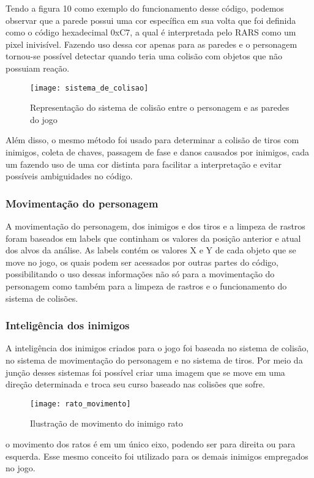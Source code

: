 \documentclass[conference]{IEEEtran}
\begin{document}
Tendo a figura 10 como exemplo do funcionamento desse código, podemos observar que a parede possui uma cor específica em sua volta que foi definida como o código hexadecimal 0xC7, a qual é interpretada pelo RARS como um pixel inivisível. Fazendo uso dessa cor apenas para as paredes e o personagem tornou-se possível detectar quando teria uma colisão com objetos que não possuiam reação.

\begin{figure}[h]
\centering
\texttt{[image: sistema\_de\_colisao]}
\caption{Representação do sistema de colisão entre o personagem e as paredes do jogo}
\end{figure}  

Além disso, o mesmo método foi usado para determinar a colisão de tiros com inimigos, coleta de chaves, passagem de fase e danos causados por inimigos, cada um fazendo uso de uma cor distinta para facilitar a interpretação e evitar possíveis ambiguidades no código.
\subsubsection{Movimentação do personagem} 
  A movimentação do personagem, dos inimigos e dos tiros e a limpeza de rastros foram baseados em labels que continham  os valores da posição anterior e atual dos alvos da análise. As labels contém os valores X e Y de cada objeto que se move no jogo, os quais podem ser acessados por outras partes do código, possibilitando o uso dessas informações não só para a movimentação do personagem como também para a limpeza de rastros e o funcionamento do sistema de colisões.
  
\subsubsection{Inteligência dos inimigos} 
A inteligência dos inimigos criados para o jogo foi baseada no sistema de colisão, no sistema de movimentação do personagem e no sistema de tiros. Por meio da junção desses sistemas foi possível criar uma imagem que se move em uma direção determinada e troca seu curso baseado nas colisões que sofre.

\begin{figure}[h]
\centering
\texttt{[image: rato\_movimento]}
\caption{Ilustração de movimento do inimigo rato}
\end{figure}  

o movimento dos ratos é em um único eixo, podendo ser para direita ou para esquerda. Esse mesmo conceito foi utilizado para os demais inimigos empregados no jogo.
\end{document}
